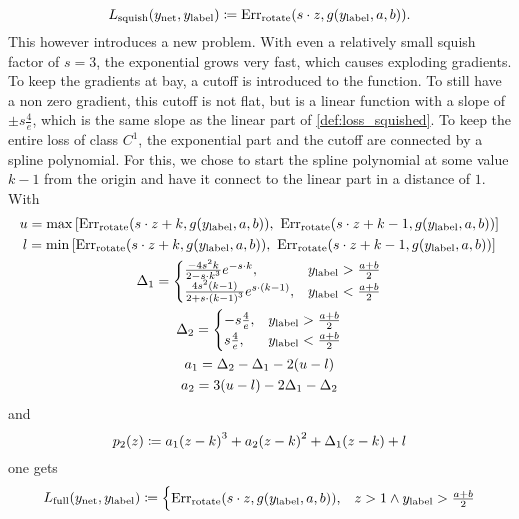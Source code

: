 \begin{equation}\label{def:loss_squished}
L_\text{squish}{\left( y_\text{net}, y_\text{label} \right)}\coloneqq \text{Err}_\text{rotate}{\left( s\cdot z, g(y_\text{label},a,b) \right)}.
\end{equation}
This however introduces a new problem. With even a relatively small squish factor of $s=3$, the exponential grows very fast, which causes exploding gradients. To keep the gradients at bay, a cutoff is introduced to the function. To still have a non zero gradient, this cutoff is not flat, but is a linear function with a slope of $\pm s\frac{4}{e}$, which is the same slope as the linear part of \eqref{def:loss_squished}. To keep the entire loss of class $C^1$, the exponential part and the cutoff are connected by a spline polynomial. For this, we chose to start the spline polynomial at some value $k-1$ from the origin and have it connect to the linear part in a distance of $1$.\\
With
\begin{gather}
u = \max\left[\text{Err}_\text{rotate}{\left( s\cdot z + k, g(y_\text{label},a,b) \right)},\ \text{Err}_\text{rotate}{\left( s\cdot z + k - 1, g(y_\text{label},a,b) \right)}\right]\nonumber\\
l = \min\left[\text{Err}_\text{rotate}{\left( s\cdot z + k, g(y_\text{label},a,b) \right)},\ \text{Err}_\text{rotate}{\left( s\cdot z + k - 1, g(y_\text{label},a,b) \right)}\right]\nonumber\\
\Delta_1 = 
\begin{cases}
	\frac{-4 s^2 k}{{2-s\cdot k}^3}e^{-s\cdot k}, & y_\text{label} > \frac{a+b}{2}\\
	\frac{4 s^2 (k-1)}{{2+s\cdot (k-1)}^3}e^{s\cdot (k-1)}, & y_\text{label} < \frac{a+b}{2}
\end{cases}\nonumber\\
\Delta_2 =
\begin{cases}
	-s\frac{4}{e}, & y_\text{label} > \frac{a+b}{2}\\
	s\frac{4}{e}, & y_\text{label} < \frac{a+b}{2}
\end{cases}\\
a_1 = \Delta_2 - \Delta_1 - 2{\left( u-l \right)}\\
a_2 = 3{\left( u-l \right)} - 2\Delta_1 - \Delta_2
\end{gather}
and
\begin{equation}
p_2(z)\coloneqq a_1 {\left( z-k \right)}^3 + a_2{\left( z-k \right)}^2 + \Delta_1 {\left( z-k \right)} + l
\end{equation}
one gets
\begin{equation}
L_\text{full}{\left( y_\text{net}, y_\text{label} \right)}\coloneqq
\begin{cases}
	\text{Err}_\text{rotate}{\left( s\cdot z, g(y_\text{label},a,b) \right)}, & z>1\land y_\text{label}>\frac{a+b}{2}\\
	
\end{cases}
\end{equation}
